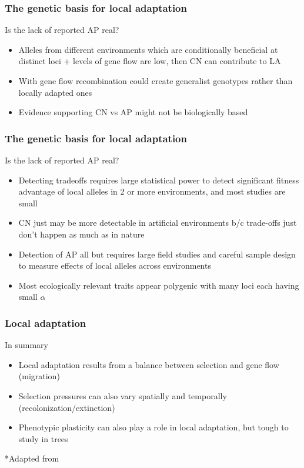 \begin{frame}
\frametitle{The genetic basis for local adaptation}
\begin{block}{Is the lack of reported AP real?}
\begin{itemize}
\item{Alleles from different environments which are conditionally 
beneficial at distinct loci + levels of gene flow are low, then 
CN can contribute to LA}
\item{With gene flow recombination could create generalist 
genotypes rather than locally adapted ones}
\item{Evidence supporting CN vs AP might not be biologically based}
\end{itemize}
\end{block}
\tiny
\citet{MitchellOlds:2007di, Anderson:2012cb}
\end{frame}


\begin{frame}
\frametitle{The genetic basis for local adaptation}
\begin{block}{Is the lack of reported AP real?}
\begin{itemize}
\item{Detecting tradeoffs requires large statistical power to detect
significant fitness advantage of local alleles in 2 or more environments, 
and most studies are small}
\item{CN just may be more detectable in artificial environments b/c trade-offs
just don't happen as much as in nature}
\item{Detection of AP all but requires large field studies and careful sample
design to measure effects of local alleles across environments}
\item{Most ecologically relevant traits appear polygenic with many loci 
each having small $\alpha$}
\end{itemize}
\end{block}
\tiny
\citet{MitchellOlds:2007di, Anderson:2012cb}
\end{frame}

\begin{frame}
\frametitle{Local adaptation}
\begin{block}{In summary}
\begin{itemize}
\item{Local adaptation results from a balance between selection and gene flow
(migration)}
\item{Selection pressures can also vary spatially and temporally
(recolonization/extinction)}
\item{Phenotypic plasticity can also play a role in local adaptation, but
tough to study in trees}
\end{itemize}
\end{block}
\tiny
*Adapted from \citet{Savolainen:2013dfa}
\end{frame}


